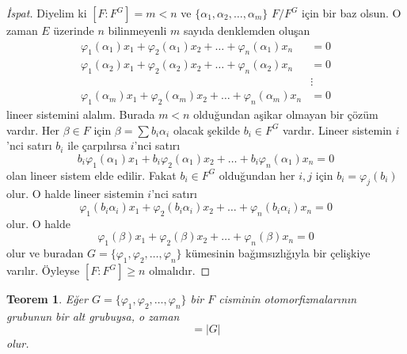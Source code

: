 \documentclass[draft]{article}
\newtheorem{thm}{Teorem}[section]
\theoremstyle{definition}
\theoremstyle{remark}
\newcommand{\envert}[1]{\left\lvert#1\right\rvert}
\let\abs=\envert
\begin{document}
    		\begin{proof}[İspat]
    	        Diyelim ki $[F : F^G] = m < n$ ve $\{\alpha_1, \alpha_2, \dots, \alpha_m\}$ $F/F^G$ için bir baz olsun. O zaman $E$ üzerinde $n$ bilinmeyenli $m$ sayıda denklemden oluşan
    	        \begin{align*}
    	            \varphi_1(\alpha_1)x_1 + \varphi_2(\alpha_1)x_2 + \dots + \varphi_n(\alpha_1)x_n &= 0\\
    	            \varphi_1(\alpha_2)x_1 + \varphi_2(\alpha_2)x_2 + \dots + \varphi_n(\alpha_2)x_n &= 0\\
    	            &\vdots\\
    	            \varphi_1(\alpha_m)x_1 + \varphi_2(\alpha_m)x_2 + \dots + \varphi_n(\alpha_m)x_n &= 0
    	        \end{align*}
    	        lineer sistemini alalım. Burada $m < n$ olduğundan aşikar olmayan bir çözüm vardır. Her $\beta \in F$ için $\beta = \sum{b_i\alpha_i}$ olacak şekilde $b_i \in F^G$ vardır. Lineer sistemin $i$'nci satırı $b_i$ ile çarpılırsa $i$'nci satırı
    	        \begin{equation*}
    	            b_i\varphi_1(\alpha_1)x_1 + b_i\varphi_2(\alpha_1)x_2 + \dots + b_i\varphi_n(\alpha_1)x_n = 0
    	        \end{equation*}
    	        olan lineer sistem elde edilir. Fakat $b_i \in F^G$ olduğundan her $i, j$ için $b_i = \varphi_j(b_i)$ olur. O halde lineer sistemin $i$'nci satırı
    	        \begin{equation*}
    	            \varphi_1(b_i\alpha_i)x_1 + \varphi_2(b_i\alpha_i)x_2 + \dots + \varphi_n(b_i\alpha_i)x_n = 0
    	        \end{equation*}
    	        olur. O halde
    	        \begin{equation*}
    	            \varphi_1(\beta)x_1 + \varphi_2(\beta)x_2 + \dots + \varphi_n(\beta)x_n = 0
    	        \end{equation*}
    	        olur ve buradan $G = \{\varphi_1, \varphi_2, \dots, \varphi_n\}$ kümesinin bağımsızlığıyla bir çelişkiye varılır. Öyleyse $[F : F^G] \geq n$ olmalıdır.
    	    \end{proof}
    		
    		\begin{thm}
    		    Eğer $G = \{\varphi_1, \varphi_2, \dots, \varphi_n\}$ bir $F$ cisminin otomorfizmalarının grubunun bir alt grubuysa, o zaman
    		    \begin{equation*}
    				[F : F^G] = \abs{G}
    			\end{equation*}
    			olur.
    		\end{thm}
    		
\end{document}
